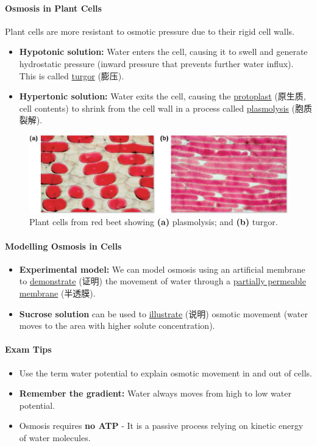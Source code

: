\paragraph{Osmosis in Plant Cells}
Plant cells are more resistant to osmotic pressure due to their rigid cell walls.
\begin{itemize}
    \item \textbf{Hypotonic solution:} Water enters the cell, causing it to swell and generate hydrostatic pressure (inward
    pressure that prevents further water influx). This is called \underline{turgor} (膨压).
    \item \textbf{Hypertonic solution:} Water exits the cell, causing the \underline{protoplast} (原生质, cell contents) to
    shrink from the cell wall in a process called \underline{plasmolysis} (胞质裂解).
\end{itemize}
\begin{figure}[H]
    \centering
    \includegraphics[scale=0.15]{Biology/2A/Images/2A-3-3.png}
    \caption{Plant cells from red beet showing \textbf{(a)} plasmolysis; and \textbf{(b)} turgor.}
\end{figure}

\paragraph{Modelling Osmosis in Cells}
\begin{itemize}
    \item \textbf{Experimental model:} We can model osmosis using an artificial membrane to \underline{demonstrate} (证明) the
    movement of water through a \underline{partially permeable membrane} (半透膜).
    \item \textbf{Sucrose solution} can be used to \underline{illustrate} (说明) osmotic movement (water moves to the area with
    higher solute concentration).
\end{itemize}

\paragraph{Exam Tips}
\begin{itemize}
    \item Use the term water potential to explain osmotic movement in and out of cells.
    \item \textbf{Remember the gradient:} Water always moves from high to low water potential.
    \item Osmosis requires \textbf{no ATP} - It is a passive process relying on kinetic energy of water molecules.
\end{itemize}